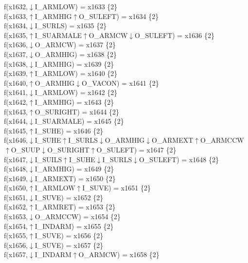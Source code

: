f(x1632,$\downarrow$I\_ARMLOW) = x1633 \{2\} \\  
f(x1633,$\uparrow$I\_ARMHIG$\uparrow$O\_SULEFT) = x1634 \{2\} \\  
f(x1634,$\downarrow$I\_SURLS) = x1635 \{2\} \\  
f(x1635,$\uparrow$I\_SUARMALE$\uparrow$O\_ARMCW$\downarrow$O\_SULEFT) = x1636 \{2\} \\  
f(x1636,$\downarrow$O\_ARMCW) = x1637 \{2\} \\  
f(x1637,$\downarrow$O\_ARMHIG) = x1638 \{2\} \\  
f(x1638,$\downarrow$I\_ARMHIG) = x1639 \{2\} \\  
f(x1639,$\uparrow$I\_ARMLOW) = x1640 \{2\} \\  
f(x1640,$\uparrow$O\_ARMHIG$\downarrow$O\_VACON) = x1641 \{2\} \\  
f(x1641,$\downarrow$I\_ARMLOW) = x1642 \{2\} \\  
f(x1642,$\uparrow$I\_ARMHIG) = x1643 \{2\} \\  
f(x1643,$\uparrow$O\_SURIGHT) = x1644 \{2\} \\  
f(x1644,$\downarrow$I\_SUARMALE) = x1645 \{2\} \\  
f(x1645,$\uparrow$I\_SUHE) = x1646 \{2\} \\  
f(x1646,$\downarrow$I\_SUHE$\uparrow$I\_SURLS$\downarrow$O\_ARMHIG$\downarrow$O\_ARMEXT$\uparrow$O\_ARMCCW$\uparrow$O\_SUUP$\downarrow$O\_SURIGHT$\uparrow$O\_SULEFT) = x1647 \{2\} \\  
f(x1647,$\downarrow$I\_SUILS$\uparrow$I\_SUHE$\downarrow$I\_SURLS$\downarrow$O\_SULEFT) = x1648 \{2\} \\  
f(x1648,$\downarrow$I\_ARMHIG) = x1649 \{2\} \\  
f(x1649,$\downarrow$I\_ARMEXT) = x1650 \{2\} \\  
f(x1650,$\uparrow$I\_ARMLOW$\uparrow$I\_SUVE) = x1651 \{2\} \\  
f(x1651,$\downarrow$I\_SUVE) = x1652 \{2\} \\  
f(x1652,$\uparrow$I\_ARMRET) = x1653 \{2\} \\  
f(x1653,$\downarrow$O\_ARMCCW) = x1654 \{2\} \\  
f(x1654,$\uparrow$I\_INDARM) = x1655 \{2\} \\  
f(x1655,$\uparrow$I\_SUVE) = x1656 \{2\} \\  
f(x1656,$\downarrow$I\_SUVE) = x1657 \{2\} \\  
f(x1657,$\downarrow$I\_INDARM$\uparrow$O\_ARMCW) = x1658 \{2\} \\  
